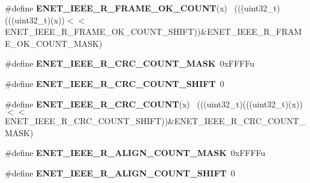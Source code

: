 \begin{DoxyCompactItemize}
\item 
\hypertarget{group___e_n_e_t___register___masks_ga39c6b3fbc26dfe5939af03f125aef9e6}{}\#define {\bfseries E\+N\+E\+T\+\_\+\+I\+E\+E\+E\+\_\+\+R\+\_\+\+F\+R\+A\+M\+E\+\_\+\+O\+K\+\_\+\+C\+O\+U\+N\+T}(x)                    ~(((uint32\+\_\+t)(((uint32\+\_\+t)(x))$<$$<$E\+N\+E\+T\+\_\+\+I\+E\+E\+E\+\_\+\+R\+\_\+\+F\+R\+A\+M\+E\+\_\+\+O\+K\+\_\+\+C\+O\+U\+N\+T\+\_\+\+S\+H\+I\+F\+T))\&E\+N\+E\+T\+\_\+\+I\+E\+E\+E\+\_\+\+R\+\_\+\+F\+R\+A\+M\+E\+\_\+\+O\+K\+\_\+\+C\+O\+U\+N\+T\+\_\+\+M\+A\+S\+K)\label{group___e_n_e_t___register___masks_ga39c6b3fbc26dfe5939af03f125aef9e6}

\item 
\hypertarget{group___e_n_e_t___register___masks_ga58cf98c5746ff20054f1870ab0c9bc5e}{}\#define {\bfseries E\+N\+E\+T\+\_\+\+I\+E\+E\+E\+\_\+\+R\+\_\+\+C\+R\+C\+\_\+\+C\+O\+U\+N\+T\+\_\+\+M\+A\+S\+K}~0x\+F\+F\+F\+Fu\label{group___e_n_e_t___register___masks_ga58cf98c5746ff20054f1870ab0c9bc5e}

\item 
\hypertarget{group___e_n_e_t___register___masks_ga68234049dc9eac210f0412acb75b5aad}{}\#define {\bfseries E\+N\+E\+T\+\_\+\+I\+E\+E\+E\+\_\+\+R\+\_\+\+C\+R\+C\+\_\+\+C\+O\+U\+N\+T\+\_\+\+S\+H\+I\+F\+T}~0\label{group___e_n_e_t___register___masks_ga68234049dc9eac210f0412acb75b5aad}

\item 
\hypertarget{group___e_n_e_t___register___masks_ga8222fe2a1d3a7601613ad0252aa52ca4}{}\#define {\bfseries E\+N\+E\+T\+\_\+\+I\+E\+E\+E\+\_\+\+R\+\_\+\+C\+R\+C\+\_\+\+C\+O\+U\+N\+T}(x)                              ~(((uint32\+\_\+t)(((uint32\+\_\+t)(x))$<$$<$E\+N\+E\+T\+\_\+\+I\+E\+E\+E\+\_\+\+R\+\_\+\+C\+R\+C\+\_\+\+C\+O\+U\+N\+T\+\_\+\+S\+H\+I\+F\+T))\&E\+N\+E\+T\+\_\+\+I\+E\+E\+E\+\_\+\+R\+\_\+\+C\+R\+C\+\_\+\+C\+O\+U\+N\+T\+\_\+\+M\+A\+S\+K)\label{group___e_n_e_t___register___masks_ga8222fe2a1d3a7601613ad0252aa52ca4}

\item 
\hypertarget{group___e_n_e_t___register___masks_ga43a415932380ce1dd7a3c8dded1421a7}{}\#define {\bfseries E\+N\+E\+T\+\_\+\+I\+E\+E\+E\+\_\+\+R\+\_\+\+A\+L\+I\+G\+N\+\_\+\+C\+O\+U\+N\+T\+\_\+\+M\+A\+S\+K}~0x\+F\+F\+F\+Fu\label{group___e_n_e_t___register___masks_ga43a415932380ce1dd7a3c8dded1421a7}

\item 
\hypertarget{group___e_n_e_t___register___masks_ga6a0f2d8593a546427d3f84a22dc05343}{}\#define {\bfseries E\+N\+E\+T\+\_\+\+I\+E\+E\+E\+\_\+\+R\+\_\+\+A\+L\+I\+G\+N\+\_\+\+C\+O\+U\+N\+T\+\_\+\+S\+H\+I\+F\+T}~0\label{group___e_n_e_t___register___masks_ga6a0f2d8593a546427d3f84a22dc05343}


\end{DoxyCompactItemize}
